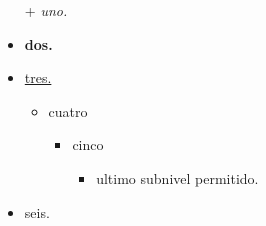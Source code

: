 \begin{itemize} %
    \renewcommand{\labelitemi}{\ding{42}} %
    \renewcommand{\labelitemii}{\ding{43}} %
    \item [+]\textit{uno.}
    \item \textbf{dos.}
    \item \underline{tres.}
    \begin{itemize}
        \item cuatro
        \begin{itemize}
            \item cinco
            \begin{itemize}
                \item ultimo subnivel permitido. %
            \end{itemize}
        \end{itemize}
    \end{itemize}
    \item seis.
\end{itemize}


